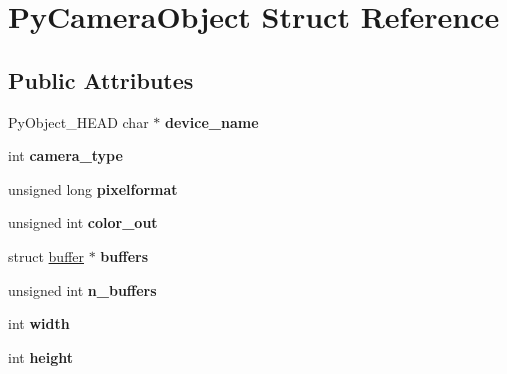 \hypertarget{struct_py_camera_object}{}\section{Py\+Camera\+Object Struct Reference}
\label{struct_py_camera_object}
\subsection*{Public Attributes}
\begin{DoxyCompactItemize}
\item 
\mbox{\label{struct_py_camera_object_ac47fec7268800a02ddb4311d44fbe56e}} 
Py\+Object\+\_\+\+H\+E\+AD char $\ast$ {\bfseries device\+\_\+name}
\item 
\mbox{\label{struct_py_camera_object_a287c05547805ad7b1111cc8f9c0844b0}} 
int {\bfseries camera\+\_\+type}
\item 
\mbox{\label{struct_py_camera_object_ac3cce897539315103a8cbb4505503ca2}} 
unsigned long {\bfseries pixelformat}
\item 
\mbox{\label{struct_py_camera_object_aab1a493b87362584947ba8b8c1420439}} 
unsigned int {\bfseries color\+\_\+out}
\item 
\mbox{\label{struct_py_camera_object_a2cd68473719b59a3b79501b43a574a1a}} 
struct \hyperlink{structbuffer}{buffer} $\ast$ {\bfseries buffers}
\item 
\mbox{\label{struct_py_camera_object_a8a06eda5ded17e035afed80e514f1256}} 
unsigned int {\bfseries n\+\_\+buffers}
\item 
\mbox{\label{struct_py_camera_object_a9f9756d8bf103ab61d5dabf852685cb1}} 
int {\bfseries width}
\item 
\mbox{\label{struct_py_camera_object_a6dfe40a74066882728c652bf4c86c266}} 
int {\bfseries height}
\item 
\mbox{\label{struct_py_camera_object_adbafd17f13d945cdfbed6b376e5f7769}} 

\end{DoxyCompactItemize}
